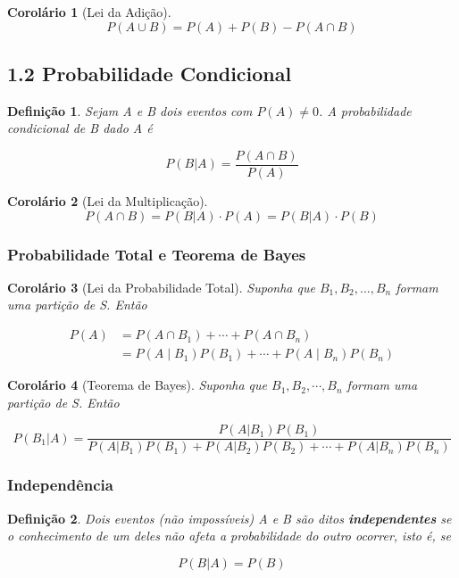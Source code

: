 \documentclass[12pt]{article}
\newtheorem{corollary}{Corolário}[theorem]
\newtheorem{definition}{Definição}
\begin{document}
\begin{corollary}[Lei da Adição]
$$P(A \cup B) = P(A) + P(B) - P(A \cap B)$$
\end{corollary}

\subsection*{1.2 Probabilidade Condicional}
\label{s3}

\begin{definition}
Sejam A e B dois eventos com $P(A) \neq 0$. A probabilidade condicional de B dado A é

$$P(B|A) = \dfrac{P(A \cap B)}{P(A)}$$
\end{definition}

\begin{corollary}[Lei da Multiplicação]

$$P(A \cap B) = P(B|A) \cdot P(A) = P(B|A) \cdot P(B)$$

\end{corollary}

\subsubsection*{Probabilidade Total e Teorema de Bayes}
\begin{corollary}[Lei da Probabilidade Total]
Suponha que $B_1, B_2, \dots, B_n$ formam uma partição de S. Então

\begin{align}
    P(A) &= P(A \cap B_1) + \dotsb + P(A \cap B_n) \nonumber \\
    &= P(A \mid B_1) P(B_1) + \dotsb + P(A \mid B_n) P(B_n) \nonumber
\end{align}

\end{corollary}

\begin{corollary}[Teorema de Bayes]
Suponha que $B_1, B_2, \cdots, B_n$ formam uma partição de S. Então

$$P(B_1|A) = \dfrac{P(A|B_1) P(B_1)}{P(A|B_1) P(B_1) + P(A|B_2) P(B_2) + \cdots + P(A|B_n) P(B_n)}$$

\end{corollary}

\subsubsection*{Independência}
\begin{definition}
Dois eventos (não impossíveis) A e B são ditos \textbf{independentes} se o conhecimento de um deles não afeta a probabilidade do outro ocorrer, isto é, se

$$P(B|A) = P(B)$$
\end{definition}
\end{document}
